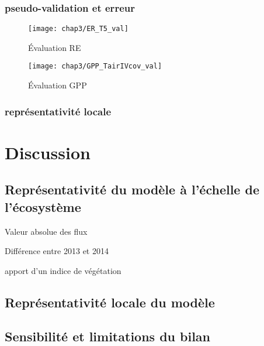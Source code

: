 \subsubsection{pseudo-validation et erreur}

\begin{figure}
\centering
\texttt{[image: chap3/ER\_T5\_val]}
\caption{Évaluation RE}
\label{fig:RE_T5_val}
\end{figure}
\begin{figure}
\centering
\texttt{[image: chap3/GPP\_TairIVcov\_val]}
\caption{Évaluation GPP}
\label{fig:GPP_TairIVcov_val}
\end{figure}

\subsubsection{représentativité locale}


\section{Discussion}

\subsection{Représentativité du modèle à l'échelle de l'écosystème}

Valeur absolue des flux

Différence entre 2013 et 2014

apport d'un indice de végétation


\subsection{Représentativité locale du modèle}

\subsection{Sensibilité et limitations du bilan}


